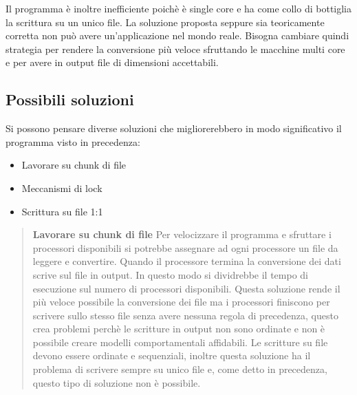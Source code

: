 \documentclass[../main.tex]{subfiles}
\begin{document}
Il programma è inoltre inefficiente poichè è single core e ha come collo di bottiglia la scrittura su un unico file. 
La soluzione proposta seppure sia teoricamente corretta non può avere un'applicazione nel mondo reale. Bisogna cambiare quindi strategia per rendere la conversione più veloce sfruttando le macchine multi core e per avere in output file di dimensioni accettabili.

\subsection{Possibili soluzioni}
Si possono pensare diverse soluzioni che migliorerebbero in modo significativo il programma visto in precedenza:

\begin{itemize}
				\item Lavorare su chunk di file
				\item Meccanismi di lock
				\item Scrittura su file 1:1
\end{itemize}

\begin{verse}
\textbf{Lavorare su chunk di file}
Per velocizzare il programma e sfruttare i processori disponibili si potrebbe assegnare ad ogni processore un file da leggere e convertire. Quando il processore termina la conversione dei dati scrive sul file in output. In questo modo si dividrebbe il tempo di esecuzione sul numero di processori disponibili. 
Questa soluzione rende il più veloce possibile la conversione dei file ma i processori finiscono per scrivere sullo stesso file senza avere nessuna regola di precedenza, questo crea problemi perchè le scritture in output non sono ordinate e non è possibile creare modelli comportamentali affidabili. Le scritture su file devono essere ordinate e sequenziali, inoltre questa soluzione ha il problema di scrivere sempre su unico file e, come detto in precedenza, questo tipo di soluzione non è possibile.
\end{verse}
\end{document}
